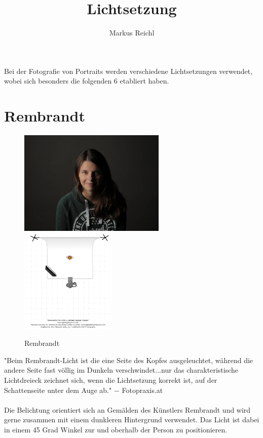 \documentclass{school}
\title{Lichtsetzung}
\author{Markus Reichl}
\begin{document}
\maketitle
\thispagestyle{fancy}

Bei der Fotografie von Portraits werden verschiedene Lichtsetzungen verwendet, wobei sich besonders die folgenden 6 etabliert haben.

\section{Rembrandt}
\begin{figure}[h]
	\centering
	\includegraphics[height=5cm]{1-rembrandt.jpg}
	\includegraphics[height=5cm]{1-rembrandt-diagram.png}
	\caption{Rembrandt}
\end{figure}

"Beim Rembrandt-Licht ist die eine Seite des Kopfes ausgeleuchtet, während die andere Seite fast völlig im Dunkeln verschwindet...nur das charakteristische Lichtdreieck zeichnet sich, wenn die Lichtsetzung korrekt ist, auf der Schattenseite unter dem Auge ab."
$-$ Fotopraxis.at \cite{fp-rembrandt}
\\\\
Die Belichtung orientiert sich an Gemälden des Künstlers Rembrandt und wird gerne zusammen mit einem dunkleren Hintergrund verwendet. Das Licht ist dabei in einem 45 Grad Winkel zur und oberhalb der Person zu positionieren.

\newpage
\end{document}

